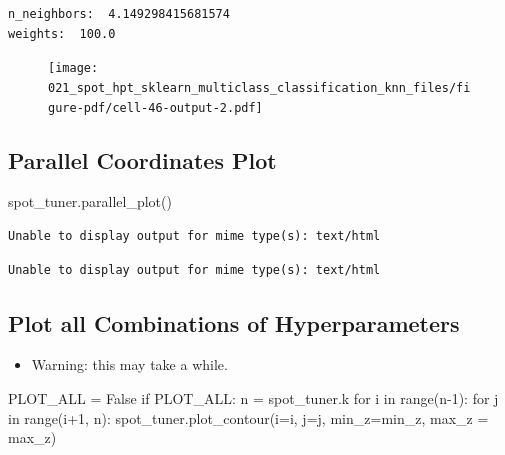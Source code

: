 \documentclass[
  letterpaper,
  DIV=11,
  numbers=noendperiod]{scrreprt}
\newenvironment{Shaded}{\begin{snugshade}}{\end{snugshade}}
\newcommand{\BuiltInTok}[1]{\textcolor[rgb]{0.00,0.23,0.31}{#1}}
\newcommand{\ControlFlowTok}[1]{\textcolor[rgb]{0.00,0.23,0.31}{#1}}
\newcommand{\DecValTok}[1]{\textcolor[rgb]{0.68,0.00,0.00}{#1}}
\newcommand{\KeywordTok}[1]{\textcolor[rgb]{0.00,0.23,0.31}{#1}}
\newcommand{\NormalTok}[1]{\textcolor[rgb]{0.00,0.23,0.31}{#1}}
\newcommand{\OperatorTok}[1]{\textcolor[rgb]{0.37,0.37,0.37}{#1}}
\newcommand{\VariableTok}[1]{\textcolor[rgb]{0.07,0.07,0.07}{#1}}
\providecommand{\tightlist}{%
  \setlength{\itemsep}{0pt}\setlength{\parskip}{0pt}}\usepackage{longtable,booktabs,array}
\begin{document}
\begin{verbatim}
n_neighbors:  4.149298415681574
weights:  100.0
\end{verbatim}

\begin{figure}[H]

{\centering \texttt{[image: 021\_spot\_hpt\_sklearn\_multiclass\_classification\_knn\_files/figure-pdf/cell-46-output-2.pdf]}

}

\end{figure}

\hypertarget{parallel-coordinates-plot-4}{%
\subsection{Parallel Coordinates
Plot}\label{parallel-coordinates-plot-4}}

\begin{Shaded}
\begin{Highlighting}[]
\NormalTok{spot\_tuner.parallel\_plot()}
\end{Highlighting}
\end{Shaded}

\begin{verbatim}
Unable to display output for mime type(s): text/html
\end{verbatim}

\begin{verbatim}
Unable to display output for mime type(s): text/html
\end{verbatim}

\hypertarget{plot-all-combinations-of-hyperparameters-4}{%
\subsection{Plot all Combinations of
Hyperparameters}\label{plot-all-combinations-of-hyperparameters-4}}

\begin{itemize}
\tightlist
\item
  Warning: this may take a while.
\end{itemize}

\begin{Shaded}
\begin{Highlighting}[]
\NormalTok{PLOT\_ALL }\OperatorTok{=} \VariableTok{False}
\ControlFlowTok{if}\NormalTok{ PLOT\_ALL:}
\NormalTok{    n }\OperatorTok{=}\NormalTok{ spot\_tuner.k}
    \ControlFlowTok{for}\NormalTok{ i }\KeywordTok{in} \BuiltInTok{range}\NormalTok{(n}\OperatorTok{{-}}\DecValTok{1}\NormalTok{):}
        \ControlFlowTok{for}\NormalTok{ j }\KeywordTok{in} \BuiltInTok{range}\NormalTok{(i}\OperatorTok{+}\DecValTok{1}\NormalTok{, n):}
\NormalTok{            spot\_tuner.plot\_contour(i}\OperatorTok{=}\NormalTok{i, j}\OperatorTok{=}\NormalTok{j, min\_z}\OperatorTok{=}\NormalTok{min\_z, max\_z }\OperatorTok{=}\NormalTok{ max\_z)}
\end{Highlighting}
\end{Shaded}
\end{document}
